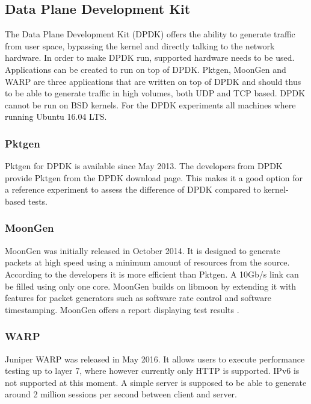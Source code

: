 \subsection{Data Plane Development Kit}\label{sub:dpdk}
The Data Plane Development Kit\cite{dpdk} (DPDK) offers the ability to generate traffic from user space, bypassing the kernel and directly talking to the network hardware. In order to make DPDK run, supported hardware needs to be used. Applications can be created to run on top of DPDK. Pktgen, MoonGen and WARP are three applications that are written on top of DPDK and should thus to be able to generate traffic in high volumes, both UDP and TCP based. DPDK cannot be run on BSD kernels. For the DPDK experiments all machines where running Ubuntu 16.04 LTS. 

\subsubsection{Pktgen}\label{subsub:dpdk-pktgen}
Pktgen for DPDK is available since May 2013. The developers from DPDK provide Pktgen from the DPDK download page. This makes it a good option for a reference experiment to assess the difference of DPDK compared to kernel-based tests. 

\subsubsection{MoonGen}\label{}
MoonGen was initially released in October 2014. It is designed to generate packets at high speed using a minimum amount of resources from the source. According to the developers it is more efficient than Pktgen. A 10Gb/s link can be filled using only one core. MoonGen builds on libmoon \cite{libmoon} by extending it with features for packet generators such as software rate control and software timestamping. MoonGen offers a report displaying test results \cite{moongenreport}.

\subsubsection{WARP}\label{subsub:dpdk-WARP17}
Juniper WARP was released in May 2016. It allows users to execute performance testing up to layer 7, where however currently only HTTP is supported. IPv6 is not supported at this moment. A simple server is supposed to be able to generate around 2 million sessions per second between client and server.  


